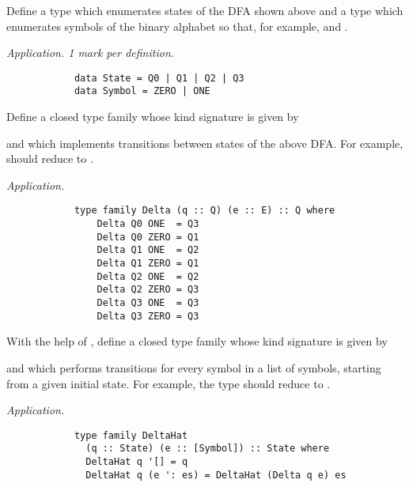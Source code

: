 \begin{parts}
	\begin{subparts}
		\subpart[2] Define a type  which enumerates states of the DFA shown above and a type  which enumerates symbols of the binary alphabet so that, for example,  and . \droppoints 
		
		\begin{solution}
			\emph{Application. 1 mark per definition.}
			\begin{verbatim}
			data State = Q0 | Q1 | Q2 | Q3 
			data Symbol = ZERO | ONE
			\end{verbatim}
		\end{solution}
		
		\subpart[4] Define a closed type family whose kind signature is given by
		\begin{center}
		\end{center}
		and which implements transitions between states of the above DFA. For example,  should reduce to . \droppoints 
		
		\begin{solution}
			\emph{Application.}
			\begin{verbatim}
			type family Delta (q :: Q) (e :: E) :: Q where 
			    Delta Q0 ONE  = Q3 
			    Delta Q0 ZERO = Q1 
			    Delta Q1 ONE  = Q2 
			    Delta Q1 ZERO = Q1
			    Delta Q2 ONE  = Q2 
			    Delta Q2 ZERO = Q3 
			    Delta Q3 ONE  = Q3 
			    Delta Q3 ZERO = Q3
			\end{verbatim}
		\end{solution}
	
		\subpart[4] With the help of , define a closed type family whose kind signature is given by
		\begin{center}
		\end{center}
		and which performs transitions for every symbol in a list of symbols, starting from a given initial state. For example, the type \linebreak {} should reduce to . \droppoints 
		
		\begin{solution}
			\emph{Application.}
			\begin{verbatim}
			type family DeltaHat 
			  (q :: State) (e :: [Symbol]) :: State where 
			  DeltaHat q '[] = q 
			  DeltaHat q (e ': es) = DeltaHat (Delta q e) es
			\end{verbatim}
		\end{solution}
	

\end{subparts}
\end{parts}
